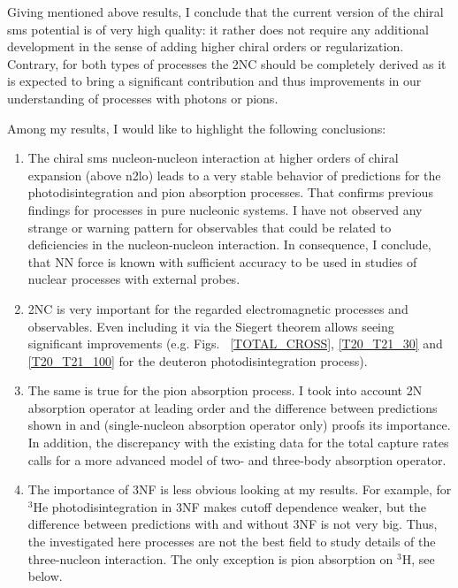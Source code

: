 Giving mentioned above results, I conclude that the current version of 
the chiral \gls{sms} potential is of very high quality:
it rather does not require any additional development in the sense of adding higher chiral orders or regularization.
Contrary, for both types of processes the 2NC should be completely derived as it is expected to bring 
a significant contribution and thus improvements in our understanding of processes
with photons or pions.

Among my results, I would like to highlight the following 
conclusions:

\begin{enumerate}
    \item The chiral \gls{sms} nucleon-nucleon interaction at higher orders of chiral expansion (above \gls{n2lo})
    leads to a very stable behavior of predictions for the photodisintegration and pion absorption processes.
    That confirms previous findings for processes in pure nucleonic systems.
    I have not observed any strange or warning pattern for observables that could be related to
    deficiencies in the nucleon-nucleon interaction.
    In consequence, I conclude, that NN force is known with sufficient accuracy to be used in studies of 
    nuclear processes with external probes.
    \item 2NC is very important for the regarded electromagnetic processes and observables. Even including it via the Siegert theorem allows seeing significant improvements (e.g. Figs.~ \ref{TOTAL_CROSS}, \ref{T20_T21_30} and \ref{T20_T21_100} for the deuteron photodisintegration process).
    \item The same is true for the pion absorption process. I took into account 2N absorption operator at leading order and the difference between
    predictions shown in  and 
    (single-nucleon absorption operator only) proofs its importance.
    In addition, the discrepancy with the existing data for the total capture rates calls for a more advanced model of two-
    and three-body absorption operator.
    \item The importance of 3NF is less obvious looking at my results.
    For example, for $^3$He photodisintegration in  3NF makes cutoff dependence weaker,
    but the difference between predictions with and without 3NF is not very big.
    Thus, the investigated here processes are not the best field to study details
    of the three-nucleon interaction.
    The only exception is pion absorption on $^3$H, see below.

\end{enumerate}
